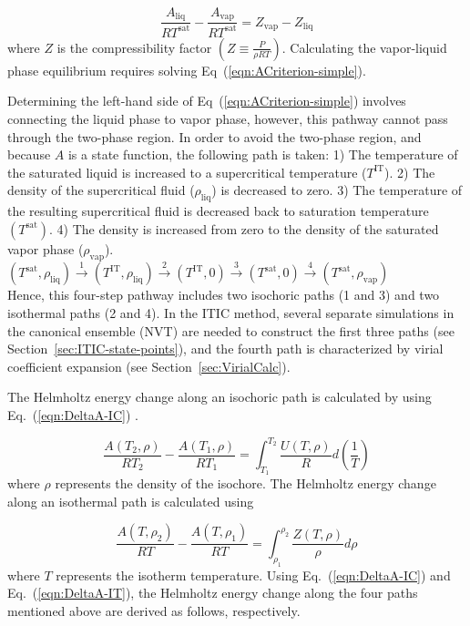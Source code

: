 \documentclass[5p,times]{elsarticle}
\begin{document}
\begin{equation}
\frac{A_\mathrm{liq}}{RT^\mathrm{sat}} - \frac{A_\mathrm{vap}}{RT^\mathrm{sat}} = Z_\mathrm{vap} - Z_\mathrm{liq} 
\label{eqn:ACriterion-simple}
\end{equation}
where $Z$ is the compressibility factor $\left(Z\equiv \frac{P}{\rho RT}\right)$. Calculating the vapor-liquid phase equilibrium requires solving Eq~(\ref{eqn:ACriterion-simple}).

Determining the left-hand side of Eq~(\ref{eqn:ACriterion-simple}) involves connecting the liquid phase to vapor phase, however, this pathway cannot pass through the two-phase region. In order to avoid the two-phase region, and because $A$ is a state function, the following path is taken: 1) The temperature of the saturated liquid is increased to a supercritical temperature ($T^\mathrm{IT}$). 2) The density of the supercritical fluid ($\rho_\mathrm{liq}$) is decreased to zero. 3) The temperature of the resulting supercritical fluid is decreased back to saturation temperature $(T^\mathrm{sat})$. 4) The density is increased from zero to the density of the saturated vapor phase ($\rho_\mathrm{vap}$).\\

$(T^\mathrm{sat},\rho_\mathrm{liq}) \xrightarrow{\text{1}} (T^\mathrm{IT},\rho_\mathrm{liq}) \xrightarrow{\text{2}} (T^\mathrm{IT},0) \xrightarrow{\text{3}} (T^\mathrm{sat},0) \xrightarrow{\text{4}} (T^\mathrm{sat},\rho_\mathrm{vap})$ \\

Hence, this four-step pathway includes two isochoric paths (1 and 3) and two isothermal paths (2 and 4). In the ITIC method, several separate simulations in the canonical ensemble (NVT) are needed to construct the first three paths (see Section~\ref{sec:ITIC-state-points}), and the fourth path is characterized by virial coefficient expansion (see Section~\ref{sec:VirialCalc}).

The Helmholtz energy change along an isochoric path is calculated by using Eq.~(\ref{eqn:DeltaA-IC}) \cite{Elliott1999}.

\begin{equation}
 \frac{A(T_2,\rho)}{RT_2} -  \frac{A(T_1,\rho)}{RT_1}  = \int _{T_1}^{T_2} \frac{U(T,\rho)}{R}  d\left(\frac{1}{T}\right)
\label{eqn:DeltaA-IC}
\end{equation}
where $\rho$ represents the density of the isochore. The Helmholtz energy change along an isothermal path is calculated using

\begin{equation}
\frac{A(T,\rho_2)}{RT} -  \frac{A(T,\rho_1)}{RT}  = \int _{\rho_1}^{\rho_2} \frac{Z(T,\rho)}{\rho}  d\rho
\label{eqn:DeltaA-IT}
\end{equation}
where $T$ represents the isotherm temperature. Using Eq.~(\ref{eqn:DeltaA-IC}) and Eq.~(\ref{eqn:DeltaA-IT}), the Helmholtz energy change along the four paths mentioned above are derived as follows, respectively.
\end{document}
